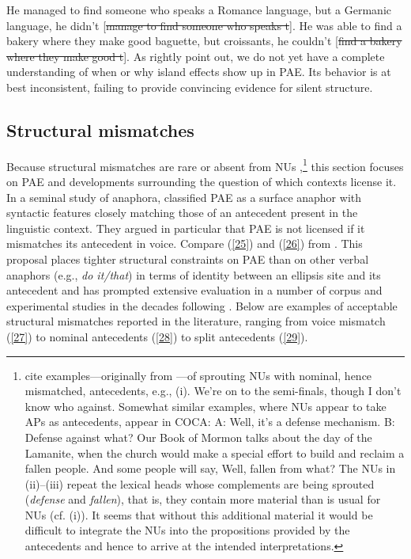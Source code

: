 \documentclass[output=paper
	        ,collection
	        ,collectionchapter
 	        ,biblatex
                ,babelshorthands
                ,newtxmath
                ,draftmode
                ,colorlinks, citecolor=brown
]{langscibook}
\begin{document}
{\ea He managed to find someone who speaks a Romance language, but a Germanic language, he didn't [\sout{manage to find someone who speaks t}].\label{23}\z
\ea He was able to find a bakery where they make good baguette, but croissants, he couldn't [\sout{find a bakery where they make good t}].\label{24}\z
As \citet{Ginzburg2018} rightly point out, we do not yet have a complete understanding of when or why island effects show up in PAE. Its behavior is at best inconsistent, failing to provide convincing evidence for silent structure.


\subsection{Structural mismatches}
\label{sec-structural-mismatches}

Because structural mismatches are rare or absent from NUs \citep[see][]{Merchant2005a, Merchant2013},\footnote{\citet{Ginzburg2018} cite examples---originally from \citet{Beecher2008}---of sprouting NUs with nominal, hence mismatched, antecedents, e.g., (i).
	\ea We're on to the semi-finals, though I don't know who against.\z
	Somewhat similar examples, where NUs appear to take APs as antecedents, appear in COCA:
	\ea  A: Well, it's a defense mechanism. B: Defense against what?\z
	\ea Our Book of Mormon talks about the day of the Lamanite, when the church would make a special effort to build and reclaim a fallen people. And some people will say, Well, fallen from what? \z
	The NUs in (ii)--(iii) repeat the lexical heads whose complements are being sprouted (\textit{defense} and \textit{fallen}), that is, they contain more material than is usual for NUs (cf. (i)). It seems that without this additional material it would be difficult to integrate the NUs into the propositions provided by the antecedents and hence to arrive at the intended interpretations.
} this section focuses on PAE and developments surrounding the question of which contexts license it. In a seminal study of anaphora, \citet{Hankamer1976} classified PAE as a surface anaphor with syntactic features closely matching those of an antecedent present in the linguistic context. They argued in particular that PAE is not licensed if it mismatches its antecedent in voice. Compare (\ref{25}) and (\ref{26}) from \citet[327]{Hankamer1976}.
\z
{}
\z
This proposal places tighter structural constraints on PAE than on other verbal anaphors (e.g., \textit{do it/that}) in terms of identity between an ellipsis site and its antecedent and has prompted extensive evaluation in a number of corpus and experimental studies in the decades following \citet{Hankamer1976}. Below are examples of acceptable structural mismatches reported in the literature, ranging from voice mismatch (\ref{27}) to nominal antecedents (\ref{28}) to split antecedents (\ref{29}).

}
\end{document}
